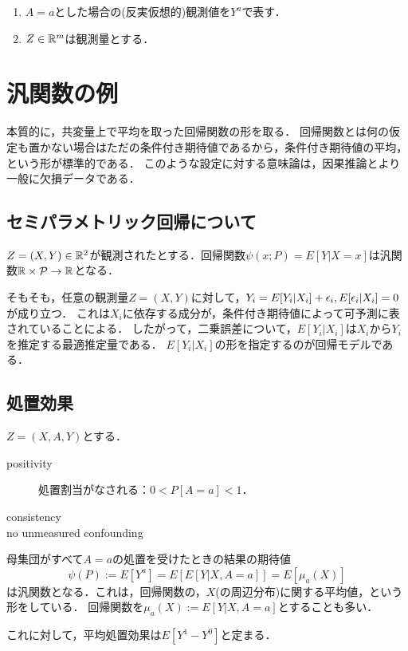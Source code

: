 \documentclass[uplatex,dvipdfmx]{jsreport}
\begin{document}
\begin{notation}\mbox{}
    \begin{enumerate}
        \item $A=a$とした場合の(反実仮想的)観測値を$Y^a$で表す．
        \item $Z\in\mathbb{R}^m$は観測量とする．
    \end{enumerate}
\end{notation}

\section{汎関数の例}

\begin{tcolorbox}[colframe=ForestGreen, colback=ForestGreen!10!white,breakable,colbacktitle=ForestGreen!40!white,coltitle=black,fonttitle=\bfseries\sffamily,
title=]
    本質的に，共変量上で平均を取った回帰関数の形を取る．
    回帰関数とは何の仮定も置かない場合はただの条件付き期待値であるから，条件付き期待値の平均，という形が標準的である．
    このような設定に対する意味論は，因果推論とより一般に欠損データである．
\end{tcolorbox}

\subsection{セミパラメトリック回帰について}

\begin{example}
    $Z=(X,Y)\in\mathbb{R}^2$が観測されたとする．回帰関数$\psi(x;P)=E[Y|X=x]$は汎関数$\mathbb{R}\times\mathcal{P}\to\mathbb{R}$となる．

    そもそも，任意の観測量$Z=(X,Y)$に対して，$Y_i=E[Y_i|X_i]+\epsilon_i,E[\epsilon_i|X_i]=0$が成り立つ．
    これは$X_i$に依存する成分が，条件付き期待値によって可予測に表されていることによる．
    したがって，二乗誤差について，$E[Y_i|X_i]$は$X_i$から$Y_i$を推定する最適推定量である．
    $E[Y_i|X_i]$の形を指定するのが回帰モデルである．
\end{example}

\subsection{処置効果}

\begin{example}[平均処置効果]
    $Z=(X,A,Y)$とする．
    \begin{description}
        \item[positivity] 処置割当がなされる：$0<P[A=a]<1$．
        \item[consistency] 
        \item[no unmeasured confounding] 
    \end{description}
    母集団がすべて$A=a$の処置を受けたときの結果の期待値
    \[\psi(P):=E[Y^a]=E[E[Y|X,A=a]]=E[\mu_a(X)]\]
    は汎関数となる．これは，回帰関数の，$X$(の周辺分布)に関する平均値，という形をしている．
    回帰関数を$\mu_a(X):=E[Y|X,A=a]$とすることも多い．

    これに対して，平均処置効果は$E[Y^1-Y^0]$と定まる．
\end{example}
\end{document}
